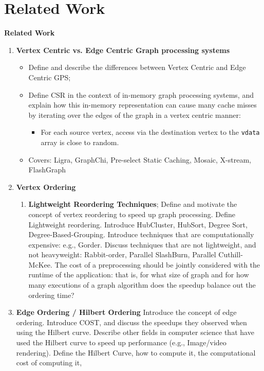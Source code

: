 
\chapter{Related Work}
\label{ch:relatedwork}
\textbf{Related Work}
\begin{enumerate}[label*=\arabic*.]
  \item {\textbf{Vertex Centric vs. Edge Centric Graph processing systems}}
        \begin{itemize}
          \item Define and describe the differences between Vertex Centric and Edge Centric GPS;
          \item Define CSR in the context of in-memory graph processing systems, and explain how this in-memory representation can cause many cache misses by iterating over the edges of the graph in a
                vertex centric manner:
                \begin{itemize}
                  \item For each source vertex, access via the destination vertex to the \texttt{vdata} array is close to random.
                \end{itemize}
          \item Covers: Ligra, GraphChi, Pre-select Static Caching, Mosaic, X-stream, FlashGraph
        \end{itemize}
        \item{\textbf{Vertex Ordering}
                    \begin{enumerate}[label*=\arabic*.]
                      \item{\textbf{Lightweight Reordering Techniques}; Define and motivate the concept of vertex reordering to speed up graph processing. Define Lightweight reordering.
                                  Introduce HubCluster, HubSort, Degree Sort, Degree-Based-Grouping. Introduce techniques that are computationally expensive: e.g., Gorder. Discuss techniques that are
                                  not lightweight, and not heavyweight: Rabbit-order, Parallel SlashBurn, Parallel Cuthill-McKee. The cost of a preprocessing should be jointly considered with the runtime of the application: that is, for what size of graph and for how many executions of a graph algorithm does the speedup balance out the ordering time?}
                    \end{enumerate}
              }
        \item{\textbf{Edge Ordering / Hilbert Ordering}
                    Introduce the concept of edge ordering. Introduce COST, and discuss the speedups they observed when using the Hilbert curve. Describe other fields in computer science that have used the Hilbert curve to speed up performance (e.g., Image/video rendering). Define the Hilbert Curve, how to compute it, the computational cost of computing it,
}
\end{enumerate}
